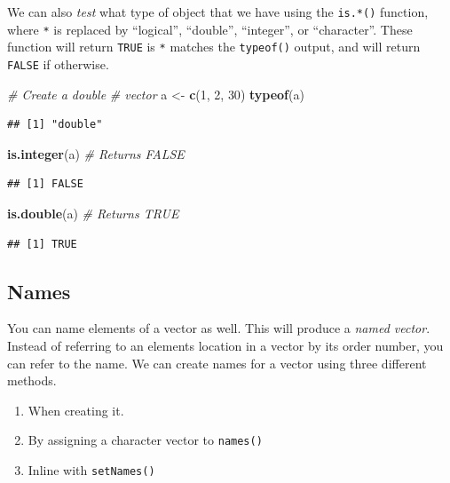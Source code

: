 \documentclass[
]{book}
\newenvironment{Shaded}{\begin{snugshade}}{\end{snugshade}}
\newcommand{\CommentTok}[1]{\textcolor[rgb]{0.56,0.35,0.01}{\textit{#1}}}
\newcommand{\DecValTok}[1]{\textcolor[rgb]{0.00,0.00,0.81}{#1}}
\newcommand{\KeywordTok}[1]{\textcolor[rgb]{0.13,0.29,0.53}{\textbf{#1}}}
\newcommand{\NormalTok}[1]{#1}
\newcommand{\StringTok}[1]{\textcolor[rgb]{0.31,0.60,0.02}{#1}}
\begin{document}
We can also \emph{test} what type of object that we have using the \texttt{is.*()} function, where \texttt{*} is replaced by ``logical'', ``double'', ``integer'', or ``character''. These function will return \texttt{TRUE} is \texttt{*} matches the \texttt{typeof()} output, and will return \texttt{FALSE} if otherwise.

\begin{Shaded}
\begin{Highlighting}[]
\CommentTok{# Create a double}
\CommentTok{# vector}
\NormalTok{a <-}\StringTok{ }\KeywordTok{c}\NormalTok{(}\DecValTok{1}\NormalTok{, }\DecValTok{2}\NormalTok{, }\DecValTok{30}\NormalTok{)}
\KeywordTok{typeof}\NormalTok{(a)}
\end{Highlighting}
\end{Shaded}

\begin{verbatim}
## [1] "double"
\end{verbatim}

\begin{Shaded}
\begin{Highlighting}[]
\KeywordTok{is.integer}\NormalTok{(a)  }\CommentTok{# Returns FALSE}
\end{Highlighting}
\end{Shaded}

\begin{verbatim}
## [1] FALSE
\end{verbatim}

\begin{Shaded}
\begin{Highlighting}[]
\KeywordTok{is.double}\NormalTok{(a)  }\CommentTok{# Returns TRUE}
\end{Highlighting}
\end{Shaded}

\begin{verbatim}
## [1] TRUE
\end{verbatim}

\hypertarget{names}{%
\subsection{Names}\label{names}}

You can name elements of a vector as well. This will produce a \emph{named vector}. Instead of referring to an elements location in a vector by its order number, you can refer to the name. We can create names for a vector using three different methods.

\begin{enumerate}
\def\labelenumi{\arabic{enumi})}
\item
  When creating it.
\item
  By assigning a character vector to \texttt{names()}
\item
  Inline with \texttt{setNames()}
\end{enumerate}
\end{document}
